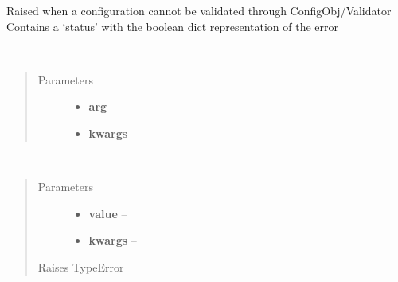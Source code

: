 \documentclass[letterpaper,10pt,english]{sphinxmanual}
\begin{document}

\begin{fulllineitems}
\label{index:aietes.Tools.ConfigError}
Raised when a configuration cannot be validated through ConfigObj/Validator
Contains a `status' with the boolean dict representation of the error

\end{fulllineitems}


\begin{fulllineitems}
\label{index:aietes.Tools.Dotdict}~\begin{quote}\begin{description}
\item[{Parameters}] \leavevmode\begin{itemize}
\item {} 
\textbf{arg} -- 

\item {} 
\textbf{kwargs} -- 

\end{itemize}

\end{description}\end{quote}

\end{fulllineitems}


\begin{fulllineitems}
\label{index:aietes.Tools.Dotdictify}~\begin{quote}\begin{description}
\item[{Parameters}] \leavevmode\begin{itemize}
\item {} 
\textbf{value} -- 

\item {} 
\textbf{kwargs} -- 

\end{itemize}

\item[{Raises TypeError}] \leavevmode


\end{description}\end{quote}

\end{fulllineitems}
\end{document}
